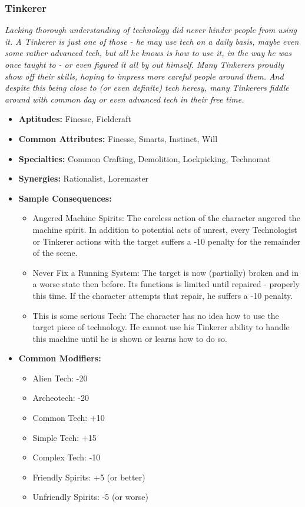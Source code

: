 \subsubsection{Tinkerer}\label{Tinkerer}
\textit{Lacking thorough understanding of technology did never hinder people from using it.
A Tinkerer is just one of those - he may use tech on a daily basis, maybe even some rather advanced tech, but all he knows is how to use it, in the way he was once taught to - or even figured it all by out himself.
Many Tinkerers proudly show off their skills, hoping to impress more careful people around them.
And despite this being close to (or even definite) tech heresy, many Tinkerers fiddle around with common day or even advanced tech in their free time.}
\begin{itemize}
	\item \textbf{Aptitudes:} Finesse, Fieldcraft
	\item \textbf{Common Attributes:} Finesse, Smarts, Instinct, Will
	\item \textbf{Specialties:} Common Crafting, Demolition, Lockpicking, Technomat
	\item \textbf{Synergies:} Rationalist, Loremaster
	\item \textbf{Sample Consequences:} 
	\begin{itemize}
		\item Angered Machine Spirits: The careless action of the character angered the machine spirit. In addition to potential acts of unrest, every Technologist or Tinkerer actions with the target suffers a -10 penalty for the remainder of the scene.
		\item Never Fix a Running System: The target is now (partially) broken and in a worse state then before. Its functions is limited until repaired - properly this time. If the character attempts that repair, he suffers a -10 penalty.
		\item This is some serious Tech: The character has no idea how to use the target piece of technology. He cannot use his Tinkerer ability to handle this machine until he is shown or learns how to do so.
	\end{itemize}
	\item \textbf{Common Modifiers:}
	\begin{itemize}
		\item Alien Tech: -20
		\item Archeotech: -20
		\item Common Tech: +10
		\item Simple Tech: +15
		\item Complex Tech: -10
		\item Friendly Spirits: +5 (or better)
		\item Unfriendly Spirits: -5 (or worse)
	\end{itemize}
\end{itemize}

